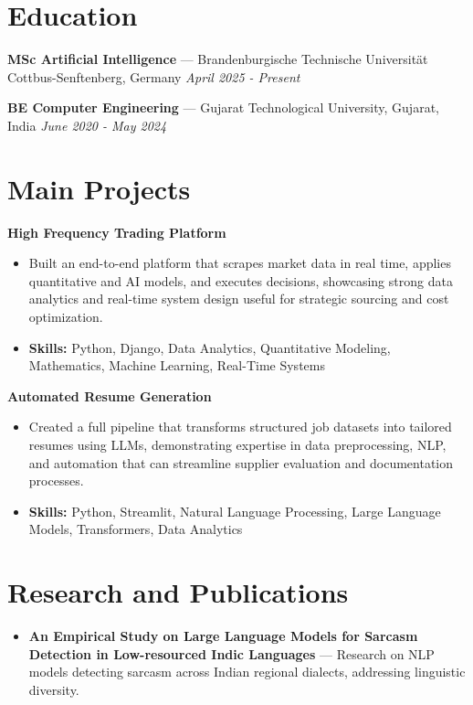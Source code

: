 \documentclass[a4paper,10pt]{article}
\begin{document}
\section*{Education}
\textbf{MSc Artificial Intelligence} — Brandenburgische Technische Universität Cottbus-Senftenberg, Germany \hfill \textit{April 2025 - Present}\par
\vspace{1.5pt}
\textbf{BE Computer Engineering} — Gujarat Technological University, Gujarat, India \hfill \textit{June 2020 - May 2024}\par

\section*{Main Projects}
\textbf{High Frequency Trading Platform}\par
\vspace{1pt}
\begin{itemize}
  \item Built an end-to-end platform that scrapes market data in real time, applies quantitative and AI models, and executes decisions, showcasing strong data analytics and real-time system design useful for strategic sourcing and cost optimization.
  \item \textbf{Skills:} Python, Django, Data Analytics, Quantitative Modeling, Mathematics, Machine Learning, Real-Time Systems
\end{itemize}
\vspace{3pt}
\textbf{Automated Resume Generation}\par
\vspace{1pt}
\begin{itemize}
  \item Created a full pipeline that transforms structured job datasets into tailored resumes using LLMs, demonstrating expertise in data preprocessing, NLP, and automation that can streamline supplier evaluation and documentation processes.
  \item \textbf{Skills:} Python, Streamlit, Natural Language Processing, Large Language Models, Transformers, Data Analytics
\end{itemize}

\section*{Research and Publications}
\begin{itemize}
\item \textbf{An Empirical Study on Large Language Models for Sarcasm Detection in Low-resourced Indic Languages} — Research on NLP models detecting sarcasm across Indian regional dialects, addressing linguistic diversity.
\end{itemize}
\end{document}
